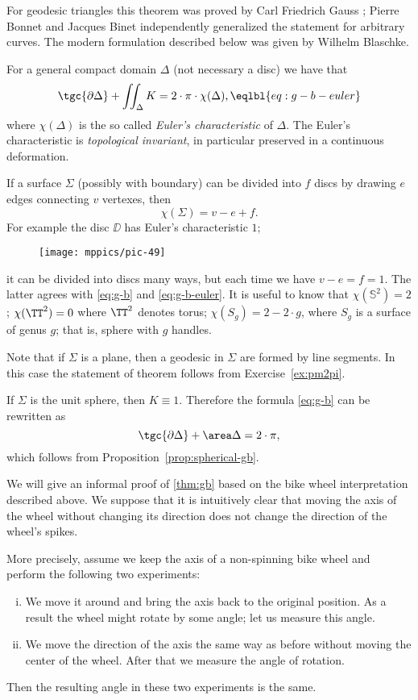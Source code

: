 For geodesic triangles this theorem was proved by Carl Friedrich Gauss \cite{gauss};
Pierre Bonnet and Jacques Binet independently generalized the statement for arbitrary curves. 
The modern formulation described below was given by Wilhelm Blaschke. 


For a general compact domain $\Delta$ (not necessary a disc) we have that
\[\tgc{\partial\Delta}+\iint_{\Delta} K=2\cdot  \pi\cdot\chi(\Delta),\eqlbl{eq:g-b-euler}\]
where $\chi(\Delta)$ is the so called \emph{Euler's characteristic} of $\Delta$.
The Euler's characteristic is \emph{topological invariant}, in particular preserved in a continuous deformation.

If a surface $\Sigma$ (possibly with boundary) can be divided into $f$ discs by drawing $e$ edges connecting $v$ vertexes, then 
\[\chi(\Sigma)=v-e+f.\]
For example the disc $\DD$ has Euler's characteristic $1$; 
\begin{figure}[h!]
\vskip-0mm
\centering
\texttt{[image: mppics/pic-49]}
\vskip-0mm
\end{figure}
it can be divided into discs many ways, 
but each time we have $v-e=f=1$.
The latter agrees with \ref{eq:g-b} and \ref{eq:g-b-euler}.
It is useful to know that $\chi(\mathbb{S}^2)=2$; $\chi(\TT^2)=0$ where $\TT^2$ denotes torus; 
$\chi( S_g)=2-2\cdot g$, where $S_g$ is a surface of genus $g$; that is, sphere with $g$ handles.

 Note that if $\Sigma$ is a plane, then a geodesic in $\Sigma$ are formed by line segments.
In this case the statement of theorem follows from Exercise~\ref{ex:pm2pi}.

 If $\Sigma$ is the unit sphere, then $K\equiv1$. Therefore the formula \ref{eq:g-b} can be rewritten as 
\[\tgc{\partial\Delta}+\area\Delta=2\cdot \pi,\]
which follows from Proposition~\ref{prop:spherical-gb}.

\medskip

We will give an informal proof of \ref{thm:gb} based on the bike wheel interpretation described above.
We suppose that it is intuitively clear that moving the axis of the wheel without changing its direction does not change the direction of the wheel's spikes.

More precisely, assume we keep the axis of a non-spinning bike wheel and perform the following two experiments:
\begin{enumerate}[(i)]
\item We move it around and bring the axis back to the original position. 
As a result the wheel might rotate by some angle; let us measure this angle.

\item
We move the direction of the axis the same way as before without moving the center of the wheel.
After that we measure the angle of rotation.
\end{enumerate}
Then the resulting angle in these two experiments is the same. 

